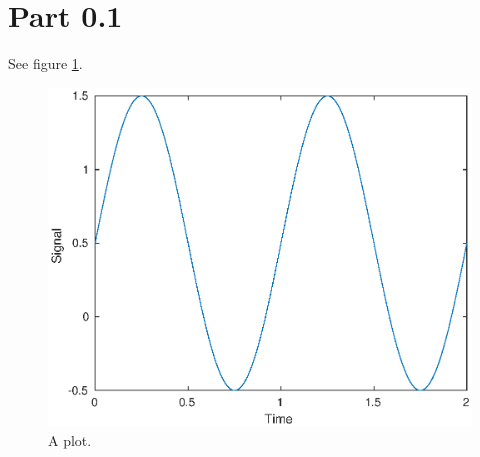 \documentclass{article}
\begin{document}
\newlength{\reparindent}
\setlength{\reparindent}{\parindent}
\raggedright
\setlength{\parindent}{\reparindent}
\section*{Part 0.1}

See figure \ref{fig:plot}.

\begin{figure}
\includegraphics[width = \linewidth]{plot.eps}

\caption{A plot.}

\label{fig:plot}
\end{figure}
\inputminted{matlab}{makeReport.m}
\end{document}

